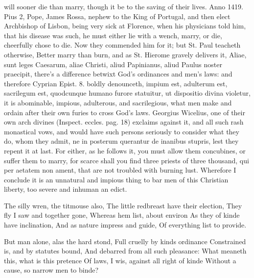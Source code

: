 {will sooner die than marry, though it be to the saving of their lives.
Anno 1419. Pius 2, Pope, James Rossa, nephew to the King of
Portugal, and then elect Archbishop of Lisbon, being very sick at
Florence, when his physicians told him, that his disease was
such, he must either lie with a wench, marry, or die, cheerfully chose
to die. Now they commended him for it; but St. Paul teacheth otherwise,
Better marry than burn, and as St. Hierome gravely delivers it, Aliae,
sunt leges Caesarum, aliae Christi, aliud Papinianus, aliud Paulus
noster praecipit, there's a difference betwixt God's ordinances and
men's laws: and therefore Cyprian Epist. 8. boldly denounceth, impium
est, adulterum est, sacrilegum est, quodcunque humano furore statuitur,
ut dispositio divina violetur, it is abominable, impious, adulterous,
and sacrilegious, what men make and ordain after their own furies to
cross God's laws. Georgius Wicelius, one of their own arch
divines (Inspect. eccles. pag. 18) exclaims against it, and all such
rash monastical vows, and would have such persons seriously to consider
what they do, whom they admit, ne in posterum querantur de inanibus
stupris, lest they repent it at last. For either, as he follows it,
you must allow them concubines, or suffer them to marry, for
scarce shall you find three priests of three thousand, qui per aetatem
non ament, that are not troubled with burning lust. Wherefore I
conclude it is an unnatural and impious thing to bar men of this
Christian liberty, too severe and inhuman an edict.

The silly wren, the titmouse also,
The little redbreast have their election,
They fly I saw and together gone,
Whereas hem list, about environ
As they of kinde have inclination,
And as nature impress and guide,
Of everything list to provide.

But man alone, alas the hard stond,
Full cruelly by kinds ordinance
Constrained is, and by statutes bound,
And debarred from all such pleasance:
What meaneth this, what is this pretence
Of laws, I wis, against all right of kinde
Without a cause, so narrow men to binde?

}
